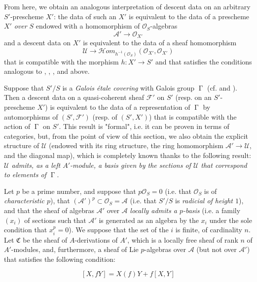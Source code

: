 From here, we obtain an analogous interpretation of descent data on an arbitrary $S'$-prescheme $X'$:
the data of such an $X'$ is equivalent to the data of a prescheme $X'$ \emph{over $S$} endowed with a homomorphism of $\mathcal{O}_S$-algebras
\[
    \mathcal{A}'\to\mathcal{O}_{X'}
\]
and a descent data on $X'$ is equivalent to the data of a sheaf homomorphism
\[
    \mathcal{U}
    \to \mathcal{H}om_{h^{-1}(\mathcal{O}_S)}(\mathcal{O}_{X'},\mathcal{O}_{X'})
\]
that is compatible with the morphism $h\colon X'\to S'$ and that satisfies the conditions analogous to , , , and  above.

\begin{example}\label{fga3.i-b.3-example-1}
    Suppose that $S'/S$ is a \emph{Galois étale covering} with Galois group $\operatorname{\Gamma}$ (cf.  and ).
    Then a descent data on a quasi-coherent sheaf $\mathcal{F}'$ on $S'$ (resp. on an $S'$-prescheme $X'$) is equivalent to the data of a representation of $\operatorname{\Gamma}$ by automorphisms of $(S',\mathcal{F}')$ (resp. of $(S',X')$) that is compatible with the action of $\operatorname{\Gamma}$ on $S'$.
    This result is "formal", i.e. it can be proven in terms of categories, but, from the point of view of this section, we also obtain the explicit structure of $\mathcal{U}$ (endowed with its ring structure, the ring homomorphism $\mathcal{A}'\to\mathcal{U}$, and the diagonal map), which is completely known thanks to the following result:
    \emph{$\mathcal{U}$ admits, as a left $A'$-module, a basis given by the sections of $\mathcal{U}$ that correspond to elements of $\operatorname{\Gamma}$}.
\end{example}

\begin{example}\label{fga3.i-b.3-example-2}
    Let $p$ be a prime number, and suppose that $p\mathcal{O}_S=0$ (i.e. that $\mathcal{O}_S$ is of \emph{characteristic $p$}), that $(\mathcal{A}')^p\subset\mathcal{O}_S=\mathcal{A}$ (i.e. that $S'/S$ is \emph{radicial of height $1$}), and that the sheaf of algebras $\mathcal{A}'$ over $\mathcal{A}$ \emph{locally admits a $p$-basis} (i.e. a family $(x_i)$ of sections such that $\mathcal{A}'$ is generated as an algebra by the $x_i$ under the sole condition that $x_i^p=0$).
    We suppose that the set of the $i$ is finite, of cardinality $n$.
    Let $\mathfrak{C}$ be the sheaf of $A$-derivations of $A'$, which is a locally free sheaf of rank $n$ of $A'$-modules, and, furthermore, a sheaf of Lie $p$-algebras over $\mathcal{A}$ (but not over $\mathcal{A}'$) that satisfies the following condition:

    \begin{equation}\tag{3.5}\label{fga3.i-b.3-equation-3.5}
        [X,fY] = X(f)Y + f[X,Y]
    \end{equation}
\end{example}

